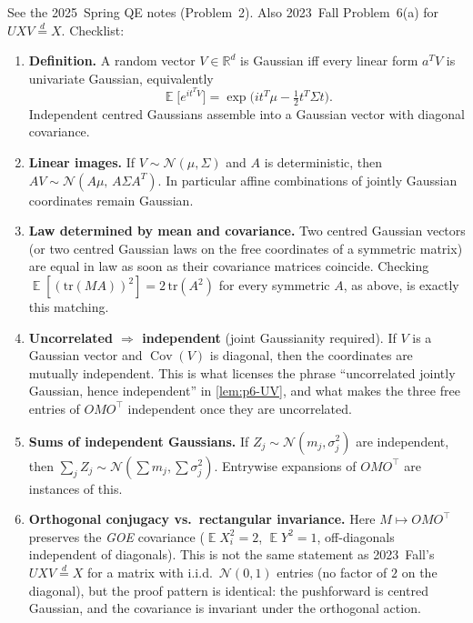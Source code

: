 \documentclass[11pt,a4paper]{article}
\DeclareMathOperator{\E}{\mathbb{E}}
\DeclareMathOperator{\Cov}{Cov}
\begin{document}
\begin{remark*}
See the 2025~Spring QE notes (Problem~2). Also 2023~Fall Problem~6(a) for \(UXV\stackrel{d}{=}X\). Checklist:

\begin{enumerate}[label=(\roman*)]
    \item
    \textbf{Definition.} A random vector \(V\in\mathbb{R}^{d}\) is Gaussian iff every linear form \(a^{T}V\) is univariate Gaussian, equivalently
    \[
    \E\bigl[e^{it^{T}V}\bigr]
    =
    \exp\bigl(it^{T}\mu-\tfrac12 t^{T}\Sigma t\bigr).
    \]
    Independent centred Gaussians assemble into a Gaussian vector with diagonal covariance.
    \item
    \textbf{Linear images.} If \(V\sim\mathcal{N}(\mu,\Sigma)\) and \(A\) is deterministic, then \(AV\sim\mathcal{N}(A\mu,\,A\Sigma A^{T})\). In particular affine combinations of jointly Gaussian coordinates remain Gaussian.
    \item
    \textbf{Law determined by mean and covariance.} Two centred Gaussian vectors (or two centred Gaussian laws on the free coordinates of a symmetric matrix) are equal in law as soon as their covariance matrices coincide. Checking \(\E[(\mathrm{tr}(MA))^2]=2\,\mathrm{tr}(A^2)\) for every symmetric \(A\), as above, is exactly this matching.
    \item
    \textbf{Uncorrelated \(\Rightarrow\) independent} (joint Gaussianity required). If \(V\) is a Gaussian vector and \(\Cov(V)\) is diagonal, then the coordinates are mutually independent. This is what licenses the phrase ``uncorrelated jointly Gaussian, hence independent'' in \cref{lem:p6-UV}, and what makes the three free entries of \(OMO^\top\) independent once they are uncorrelated.
    \item
    \textbf{Sums of independent Gaussians.} If \(Z_{j}\sim\mathcal{N}(m_{j},\sigma_{j}^{2})\) are independent, then \(\sum_{j}Z_{j}\sim\mathcal{N}(\sum m_{j},\sum\sigma_{j}^{2})\). Entrywise expansions of \(OMO^\top\) are instances of this.
    \item
    \textbf{Orthogonal conjugacy vs.\ rectangular invariance.} Here \(M\mapsto OMO^\top\) preserves the \emph{GOE} covariance (\(\E X_{i}^{2}=2\), \(\E Y^{2}=1\), off-diagonals independent of diagonals). This is not the same statement as 2023~Fall's \(UXV\stackrel{d}{=}X\) for a matrix with i.i.d.\ \(\mathcal{N}(0,1)\) entries (no factor of \(2\) on the diagonal), but the proof pattern is identical: the pushforward is centred Gaussian, and the covariance is invariant under the orthogonal action.
\end{enumerate}
\end{remark*}
\end{document}
